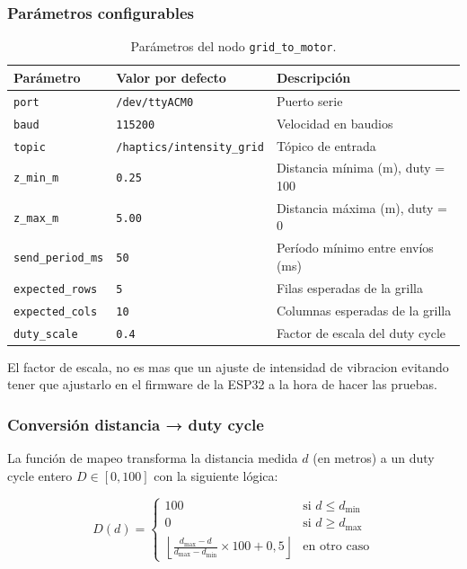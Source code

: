 \subsubsection{Parámetros configurables}

\begin{table}[H]
\centering
\begin{tabular}{lll}
\toprule
\textbf{Parámetro} & \textbf{Valor por defecto} & \textbf{Descripción} \\
\midrule
\texttt{port}           & \texttt{/dev/ttyACM0} & Puerto serie \\
\texttt{baud}           & \texttt{115200}        & Velocidad en baudios \\
\texttt{topic}          & \texttt{/haptics/intensity\_grid}  & Tópico de entrada \\
\texttt{z\_min\_m}      & \texttt{0.25}          & Distancia mínima (m), duty = 100 \\
\texttt{z\_max\_m}      & \texttt{5.00}          & Distancia máxima (m), duty = 0   \\
\texttt{send\_period\_ms} & \texttt{50}          & Período mínimo entre envíos (ms) \\
\texttt{expected\_rows} & \texttt{5}             & Filas esperadas de la grilla \\
\texttt{expected\_cols} & \texttt{10}            & Columnas esperadas de la grilla \\
\texttt{duty\_scale}    & \texttt{0.4}           & Factor de escala del duty cycle \\
\bottomrule
\end{tabular}
\caption{Parámetros del nodo \texttt{grid\_to\_motor}.}
\label{tab:hw-params}
\end{table}

El factor de escala, no es mas que un ajuste de intensidad de vibracion evitando tener que
ajustarlo en el firmware de la ESP32 a la hora de hacer las pruebas.

\subsubsection{Conversión distancia → duty cycle}

La función de mapeo transforma la distancia medida $d$ (en metros) a un
duty cycle entero $D \in [0, 100]$ con la siguiente lógica:

\begin{equation}
  D(d) =
  \begin{cases}
    100 & \text{si } d \leq d_{\min} \\[4pt]
    0   & \text{si } d \geq d_{\max} \\[4pt]
    \displaystyle\left\lfloor
      \frac{d_{\max} - d}{d_{\max} - d_{\min}} \times 100 + 0{,}5
    \right\rfloor
    & \text{en otro caso}
  \end{cases}
\label{eq:duty}
\end{equation}

